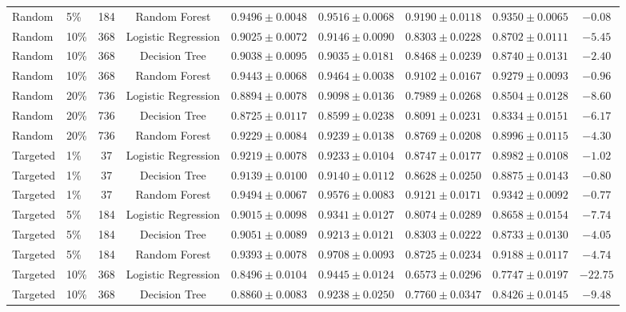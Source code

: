 \documentclass[10pt,conference]{IEEEtran}
\begin{document}
\begin{table}[htbp]
\begin{tabular}{llccccccc}
Random & 5\% & 184 & Random Forest & $0.9496 \pm 0.0048$ & $0.9516 \pm 0.0068$ & $0.9190 \pm 0.0118$ & $0.9350 \pm 0.0065$ & $-0.08$ \\
Random & 10\% & 368 & Logistic Regression & $0.9025 \pm 0.0072$ & $0.9146 \pm 0.0090$ & $0.8303 \pm 0.0228$ & $0.8702 \pm 0.0111$ & $-5.45$ \\
Random & 10\% & 368 & Decision Tree & $0.9038 \pm 0.0095$ & $0.9035 \pm 0.0181$ & $0.8468 \pm 0.0239$ & $0.8740 \pm 0.0131$ & $-2.40$ \\
Random & 10\% & 368 & Random Forest & $0.9443 \pm 0.0068$ & $0.9464 \pm 0.0038$ & $0.9102 \pm 0.0167$ & $0.9279 \pm 0.0093$ & $-0.96$ \\
Random & 20\% & 736 & Logistic Regression & $0.8894 \pm 0.0078$ & $0.9098 \pm 0.0136$ & $0.7989 \pm 0.0268$ & $0.8504 \pm 0.0128$ & $-8.60$ \\
Random & 20\% & 736 & Decision Tree & $0.8725 \pm 0.0117$ & $0.8599 \pm 0.0238$ & $0.8091 \pm 0.0231$ & $0.8334 \pm 0.0151$ & $-6.17$ \\
Random & 20\% & 736 & Random Forest & $\mathbf{0.9229 \pm 0.0084}$ & $\mathbf{0.9239 \pm 0.0138}$ & $\mathbf{0.8769 \pm 0.0208}$ & $\mathbf{0.8996 \pm 0.0115}$ & $\mathbf{-4.30}$ \\
\midrule
Targeted & 1\% & 37 & Logistic Regression & $0.9219 \pm 0.0078$ & $0.9233 \pm 0.0104$ & $0.8747 \pm 0.0177$ & $0.8982 \pm 0.0108$ & $-1.02$ \\
Targeted & 1\% & 37 & Decision Tree & $0.9139 \pm 0.0100$ & $0.9140 \pm 0.0112$ & $0.8628 \pm 0.0250$ & $0.8875 \pm 0.0143$ & $-0.80$ \\
Targeted & 1\% & 37 & Random Forest & $0.9494 \pm 0.0067$ & $0.9576 \pm 0.0083$ & $0.9121 \pm 0.0171$ & $0.9342 \pm 0.0092$ & $-0.77$ \\
Targeted & 5\% & 184 & Logistic Regression & $0.9015 \pm 0.0098$ & $0.9341 \pm 0.0127$ & $0.8074 \pm 0.0289$ & $0.8658 \pm 0.0154$ & $-7.74$ \\
Targeted & 5\% & 184 & Decision Tree & $0.9051 \pm 0.0089$ & $0.9213 \pm 0.0121$ & $0.8303 \pm 0.0222$ & $0.8733 \pm 0.0130$ & $-4.05$ \\
Targeted & 5\% & 184 & Random Forest & $0.9393 \pm 0.0078$ & $0.9708 \pm 0.0093$ & $0.8725 \pm 0.0234$ & $0.9188 \pm 0.0117$ & $-4.74$ \\
Targeted & 10\% & 368 & Logistic Regression & $0.8496 \pm 0.0104$ & $0.9445 \pm 0.0124$ & $0.6573 \pm 0.0296$ & $0.7747 \pm 0.0197$ & $-22.75$ \\
Targeted & 10\% & 368 & Decision Tree & $0.8860 \pm 0.0083$ & $0.9238 \pm 0.0250$ & $\mathbf{0.7760 \pm 0.0347}$ & $0.8426 \pm 0.0145$ & $\mathbf{-9.48}$ \\

\end{tabular}
\end{table}
\end{document}
